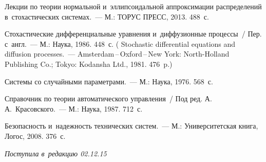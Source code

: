 \begin{multicols}{2}
{{\begin{thebibliography}{99}
Лекции по теории нормальной и~эллипсоидальной аппроксимации распределений 
в~стохастических системах.~--- М.: ТОРУС ПРЕСС, 2013. 488~с.


 Стохастические дифференциальные уравнения 
и~диффузионные процессы~/ Пер. с~англ.~--- М.: Наука, 1986. 448~с.
( 
Stochastic differential equations and diffusion processes.~--- 
Amsterdam\,--\,Oxford\,--\,New York: North-Holland Publishing Co.; 
Tokyo: Kodansha Ltd., 1981. 476~p.)






Системы со случайными параметрами.~--- М.: Наука, 1976. 568~с.

Справочник по теории автоматического управления~/ Под ред. 
А.\,А.~Красовского.~--- М.: Наука, 1987. 712~с.

 Безопасность и~надежность технических сис\-тем.~--- 
 М.: Университетская книга, Логос, 2008. 376~с.
\end{thebibliography}

 }
 }

\end{multicols}

\vspace*{-3pt}

\hfill{\small\textit{Поступила в~редакцию 02.12.15}}


\newpage

\vspace*{-24pt}





\def\tit{ANALYTICAL MODELING OF~DISTRIBUTIONS\\  IN~STOCHASTIC SYSTEMS ON~MANIFOLDS\\
 BASED ON~ELLIPSOIDAL APPROXIMATION}

\def\titkol{Analytical modeling of~distributions  in~stochastic systems on~manifolds based
on~ellipsoidal approximation}

